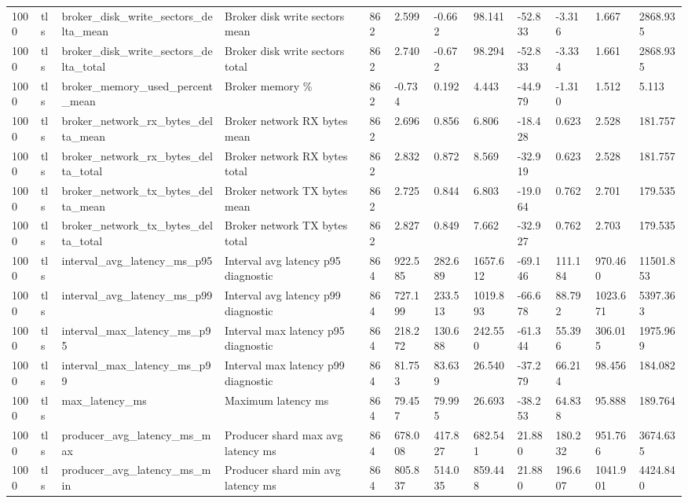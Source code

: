 \begin{longtable}{llllllllllll}
1000 & tls & broker\_disk\_write\_sectors\_delta\_mean & Broker disk write sectors mean & 862 & 2.599 & -0.662 & 98.141 & -52.833 & -3.316 & 1.667 & 2868.935 \\
1000 & tls & broker\_disk\_write\_sectors\_delta\_total & Broker disk write sectors total & 862 & 2.740 & -0.672 & 98.294 & -52.833 & -3.334 & 1.661 & 2868.935 \\
1000 & tls & broker\_memory\_used\_percent\_mean & Broker memory \% & 862 & -0.734 & 0.192 & 4.443 & -44.979 & -1.310 & 1.512 & 5.113 \\
1000 & tls & broker\_network\_rx\_bytes\_delta\_mean & Broker network RX bytes mean & 862 & 2.696 & 0.856 & 6.806 & -18.428 & 0.623 & 2.528 & 181.757 \\
1000 & tls & broker\_network\_rx\_bytes\_delta\_total & Broker network RX bytes total & 862 & 2.832 & 0.872 & 8.569 & -32.919 & 0.623 & 2.528 & 181.757 \\
1000 & tls & broker\_network\_tx\_bytes\_delta\_mean & Broker network TX bytes mean & 862 & 2.725 & 0.844 & 6.803 & -19.064 & 0.762 & 2.701 & 179.535 \\
1000 & tls & broker\_network\_tx\_bytes\_delta\_total & Broker network TX bytes total & 862 & 2.827 & 0.849 & 7.662 & -32.927 & 0.762 & 2.703 & 179.535 \\
1000 & tls & interval\_avg\_latency\_ms\_p95 & Interval avg latency p95 diagnostic & 864 & 922.585 & 282.689 & 1657.612 & -69.146 & 111.184 & 970.460 & 11501.853 \\
1000 & tls & interval\_avg\_latency\_ms\_p99 & Interval avg latency p99 diagnostic & 864 & 727.199 & 233.513 & 1019.893 & -66.678 & 88.792 & 1023.671 & 5397.363 \\
1000 & tls & interval\_max\_latency\_ms\_p95 & Interval max latency p95 diagnostic & 864 & 218.272 & 130.688 & 242.550 & -61.344 & 55.396 & 306.015 & 1975.969 \\
1000 & tls & interval\_max\_latency\_ms\_p99 & Interval max latency p99 diagnostic & 864 & 81.753 & 83.639 & 26.540 & -37.279 & 66.214 & 98.456 & 184.082 \\
1000 & tls & max\_latency\_ms & Maximum latency ms & 864 & 79.457 & 79.995 & 26.693 & -38.253 & 64.838 & 95.888 & 189.764 \\
1000 & tls & producer\_avg\_latency\_ms\_max & Producer shard max avg latency ms & 864 & 678.008 & 417.827 & 682.541 & 21.880 & 180.232 & 951.766 & 3674.635 \\
1000 & tls & producer\_avg\_latency\_ms\_min & Producer shard min avg latency ms & 864 & 805.837 & 514.035 & 859.448 & 21.880 & 196.607 & 1041.901 & 4424.840 \\

\end{longtable}
